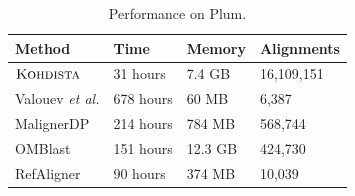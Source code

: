 \begin{table}[h]
  \caption{Performance on Plum.}

\centering
\begin{tabular}{|l|l|l|l|}
  \hline
{\bf Method}	& {\bf Time}		& {\bf Memory} 	& {\bf Alignments } \\
\hline
\hline

$\mbox{\rm \textsc{Kohdista}}$    	 	& 31 hours		& 7.4 GB  & 16,109,151 \\
Valouev {\it et al.} 		& 678 hours 	& 60 MB		&  6,387  \\
MalignerDP          & 214 hours     & 784 MB    & 568,744 \\
OMBlast             & 151 hours     & 12.3 GB   & 424,730 \\
RefAligner          & 90 hours      & 374 MB    & 10,039 \\
\hline

\end{tabular}
\label{tbl-plum}
\end{table}


